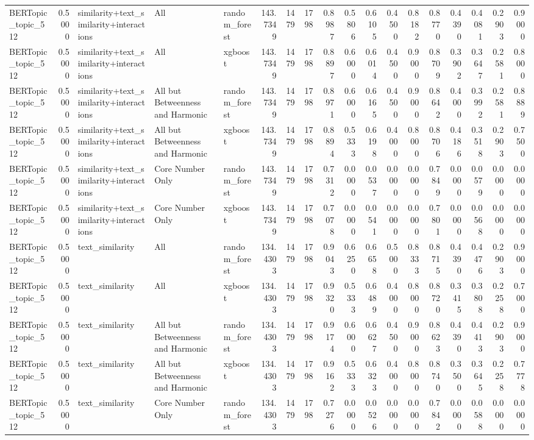 \begin{tabular}{lrlllrrrrrrrrrrrrr}
BERTopic_topic_512 & 0.5000 & similarity+text_similarity+interactions & All & random_forest & 143.7349 & 1479 & 1798 & 0.8987 & 0.5806 & 0.6105 & 0.4500 & 0.8182 & 0.8770 & 0.4390 & 0.4081 & 0.2903 & 0.9000 \\
BERTopic_topic_512 & 0.5000 & similarity+text_similarity+interactions & All & xgboost & 143.7349 & 1479 & 1798 & 0.8897 & 0.6000 & 0.6014 & 0.4500 & 0.9000 & 0.8709 & 0.3902 & 0.3647 & 0.2581 & 0.8000 \\
BERTopic_topic_512 & 0.5000 & similarity+text_similarity+interactions & All but Betweenness and Harmonic & random_forest & 143.7349 & 1479 & 1798 & 0.8971 & 0.6000 & 0.6165 & 0.4500 & 0.9000 & 0.8642 & 0.4000 & 0.3992 & 0.2581 & 0.8889 \\
BERTopic_topic_512 & 0.5000 & similarity+text_similarity+interactions & All but Betweenness and Harmonic & xgboost & 143.7349 & 1479 & 1798 & 0.8894 & 0.5333 & 0.6198 & 0.4000 & 0.8000 & 0.8706 & 0.4186 & 0.3518 & 0.2903 & 0.7500 \\
BERTopic_topic_512 & 0.5000 & similarity+text_similarity+interactions & Core Number Only & random_forest & 143.7349 & 1479 & 1798 & 0.7312 & 0.0000 & 0.0537 & 0.0000 & 0.0000 & 0.7849 & 0.0000 & 0.0579 & 0.0000 & 0.0000 \\
BERTopic_topic_512 & 0.5000 & similarity+text_similarity+interactions & Core Number Only & xgboost & 143.7349 & 1479 & 1798 & 0.7078 & 0.0000 & 0.0541 & 0.0000 & 0.0000 & 0.7801 & 0.0000 & 0.0568 & 0.0000 & 0.0000 \\
BERTopic_topic_512 & 0.5000 & text_similarity & All & random_forest & 134.4303 & 1479 & 1798 & 0.9043 & 0.6250 & 0.6658 & 0.5000 & 0.8333 & 0.8715 & 0.4390 & 0.4476 & 0.2903 & 0.9000 \\
BERTopic_topic_512 & 0.5000 & text_similarity & All & xgboost & 134.4303 & 1479 & 1798 & 0.9320 & 0.5333 & 0.6489 & 0.4000 & 0.8000 & 0.8720 & 0.3415 & 0.3808 & 0.2258 & 0.7000 \\
BERTopic_topic_512 & 0.5000 & text_similarity & All but Betweenness and Harmonic & random_forest & 134.4303 & 1479 & 1798 & 0.9174 & 0.6000 & 0.6627 & 0.4500 & 0.9000 & 0.8623 & 0.4390 & 0.4413 & 0.2903 & 0.9000 \\
BERTopic_topic_512 & 0.5000 & text_similarity & All but Betweenness and Harmonic & xgboost & 134.4303 & 1479 & 1798 & 0.9162 & 0.5333 & 0.6323 & 0.4000 & 0.8000 & 0.8740 & 0.3500 & 0.3645 & 0.2258 & 0.7778 \\
BERTopic_topic_512 & 0.5000 & text_similarity & Core Number Only & random_forest & 134.4303 & 1479 & 1798 & 0.7276 & 0.0000 & 0.0526 & 0.0000 & 0.0000 & 0.7842 & 0.0000 & 0.0588 & 0.0000 & 0.0000 \\

\end{tabular}
